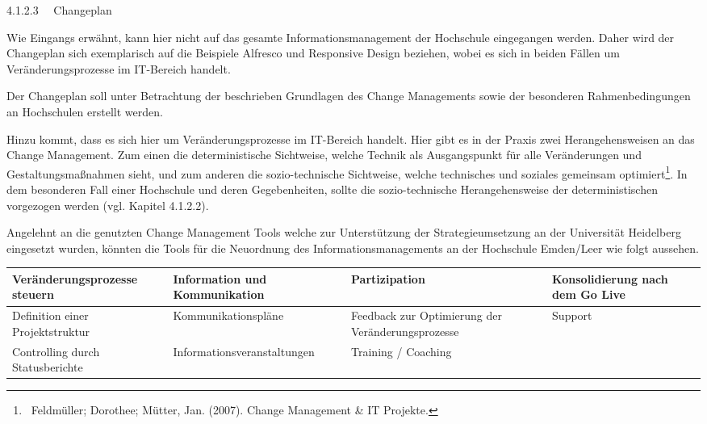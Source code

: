 \documentclass{article}
\begin{document}
\bigskip

4.1.2.3 \ \ Changeplan

Wie Eingangs erwähnt, kann hier nicht auf das gesamte Informationsmanagement der Hochschule eingegangen werden. Daher
wird der Changeplan sich exemplarisch auf die Beispiele Alfresco und Responsive Design beziehen, wobei es sich in
beiden Fällen um Veränderungsprozesse im IT-Bereich handelt. \ \ 


\bigskip

Der Changeplan soll unter Betrachtung der beschrieben Grundlagen des Change Managements sowie der besonderen
Rahmenbedingungen an Hochschulen erstellt werden. 


\bigskip

Hinzu kommt, dass es sich hier um Veränderungsprozesse im IT-Bereich handelt. Hier gibt es in der Praxis zwei
Herangehensweisen an das Change Management. Zum einen die deterministische Sichtweise, welche Technik als Ausgangspunkt
für alle Veränderungen und Gestaltungsmaßnahmen sieht, und zum anderen die sozio-technische Sichtweise, welche
technisches und soziales gemeinsam optimiert\footnote{\ Feldmüller; Dorothee; Mütter, Jan. (2007). Change Management \&
IT Projekte.}. In dem besonderen Fall einer Hochschule und deren Gegebenheiten, sollte die sozio-technische
Herangehensweise der deterministischen vorgezogen werden (vgl. Kapitel 4.1.2.2). \ 


\bigskip

Angelehnt an die genutzten Change Management Tools welche zur Unterstützung der Strategieumsetzung an der Universität
Heidelberg eingesetzt wurden, könnten die Tools für die Neuordnung des Informationsmanagements an der Hochschule
Emden/Leer wie folgt aussehen.


\bigskip

\begin{center}
\tablefirsthead{}
\tablehead{}
\tabletail{}
\tablelasttail{}
\begin{supertabular}{|m{3.675cm}|m{3.675cm}|m{3.675cm}|m{3.675cm}|}
\hline
Veränderungsprozesse steuern &
Information und Kommunikation &
Partizipation &
Konsolidierung nach dem Go Live\\\hline
Definition einer Projektstruktur &
Kommunikationspläne &
Feedback zur Optimierung der Veränderungsprozesse &
Support\\\hline
Controlling durch Statusberichte &
Informationsveranstaltungen &
Training / Coaching &
~
\\\hline
\end{supertabular}
\end{center}
\end{document}
